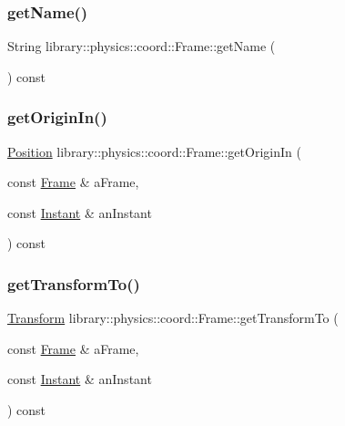 \subsubsection{\texorpdfstring{get\+Name()}{getName()}}
{\footnotesize\ttfamily String library\+::physics\+::coord\+::\+Frame\+::get\+Name (\begin{DoxyParamCaption}{ }\end{DoxyParamCaption}) const}

\mbox{\label{classlibrary_1_1physics_1_1coord_1_1_frame_a3cdd1a0db22e1112c48cff6f8d8607d5}} 
\subsubsection{\texorpdfstring{get\+Origin\+In()}{getOriginIn()}}
{\footnotesize\ttfamily \hyperlink{classlibrary_1_1physics_1_1coord_1_1_position}{Position} library\+::physics\+::coord\+::\+Frame\+::get\+Origin\+In (\begin{DoxyParamCaption}\item[{const \hyperlink{classlibrary_1_1physics_1_1coord_1_1_frame}{Frame} \&}]{a\+Frame,  }\item[{const \hyperlink{classlibrary_1_1physics_1_1time_1_1_instant}{Instant} \&}]{an\+Instant }\end{DoxyParamCaption}) const}

\mbox{\label{classlibrary_1_1physics_1_1coord_1_1_frame_ac60457a6704a977a7ef088bc4ea249f6}} 
\subsubsection{\texorpdfstring{get\+Transform\+To()}{getTransformTo()}}
{\footnotesize\ttfamily \hyperlink{classlibrary_1_1physics_1_1coord_1_1_transform}{Transform} library\+::physics\+::coord\+::\+Frame\+::get\+Transform\+To (\begin{DoxyParamCaption}\item[{const \hyperlink{classlibrary_1_1physics_1_1coord_1_1_frame}{Frame} \&}]{a\+Frame,  }\item[{const \hyperlink{classlibrary_1_1physics_1_1time_1_1_instant}{Instant} \&}]{an\+Instant }\end{DoxyParamCaption}) const}

